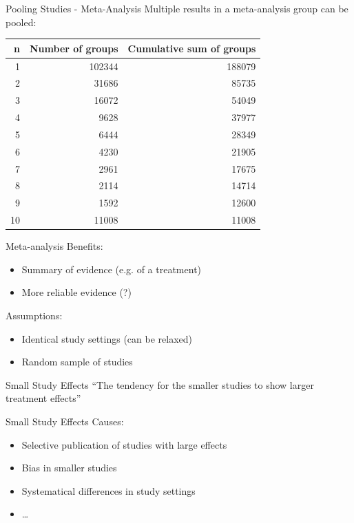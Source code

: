 \documentclass[english]{beamer}\usepackage[]{graphicx}\usepackage[]{color}
\begin{document}
\begin{frame}{Pooling Studies - Meta-Analysis}
Multiple results in a meta-analysis group can be pooled:

\begin{table}[ht]
\centering
\begingroup\footnotesize
\begin{tabular}{rrr}
  \hline
n & Number of groups & Cumulative sum of groups \\ 
  \hline
1 & 102344 & 188079 \\ 
  2 & 31686 & 85735 \\ 
  3 & 16072 & 54049 \\ 
  4 & 9628 & 37977 \\ 
  5 & 6444 & 28349 \\ 
  6 & 4230 & 21905 \\ 
  7 & 2961 & 17675 \\ 
  8 & 2114 & 14714 \\ 
  9 & 1592 & 12600 \\ 
  10 & 11008 & 11008 \\ 
   \hline
\end{tabular}
\endgroup
\label{repr.groups}
\end{table}



\end{frame}

\begin{frame}{Meta-analysis}
Benefits:
\begin{itemize}
\item Summary of evidence (e.g. of a treatment)
\item More reliable evidence (?)
\end{itemize}

Assumptions:
\begin{itemize}
\item Identical study settings (can be relaxed)
\item Random sample of studies
\end{itemize}

\end{frame}

\begin{frame}{Small Study Effects}
``The tendency for the smaller studies to show larger treatment effects'' \citep{Sterne}
\end{frame}

\begin{frame}{Small Study Effects}
Causes:
\begin{itemize}
\item Selective publication of studies with large effects
\item Bias in smaller studies
\item Systematical differences in study settings
\item \ldots
\end{itemize}
\end{frame}
\end{document}
